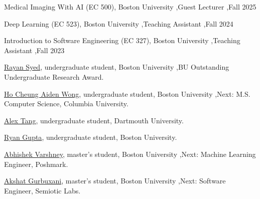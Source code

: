 \documentclass[10pt,letterpaper]{article}
\begin{document}
\begin{cvitems}
\end{cvitems}

\begin{cvitems}
\item Medical Imaging With AI (EC 500), Boston University \sep Guest Lecturer \sep Fall 2025
\item Deep Learning (EC 523), Boston University \sep Teaching Assistant \sep Fall 2024
\item Introduction to Software Engineering (EC 327), Boston University \sep Teaching Assistant \sep Fall 2023
\end{cvitems}

\begin{cvitems}
\item \href{https://www.linkedin.com/in/rayan-syed-507379296/}{Rayan Syed}, undergraduate student, Boston University \sep BU Outstanding Undergraduate Research Award.
\item \href{https://www.linkedin.com/in/aiden-wong-68962a22a/}{Ho Cheung Aiden Wong}, undergraduate student, Boston University \sep Next: M.S. Computer Science, Columbia University.
\item \href{https://www.linkedin.com/in/alexztang/}{Alex Tang}, undergraduate student, Dartmouth University.
\item \href{https://www.linkedin.com/in/ryan-gupta-a451b0262/}{Ryan Gupta}, undergraduate student, Boston University.
\item \href{https://www.linkedin.com/in/abhishek-varshney-a75748159/}{Abhishek Varshney}, master's student, Boston University \sep Next: Machine Learning Engineer, Poshmark.
\item \href{https://www.linkedin.com/in/akshatgurbuxani/}{Akshat Gurbuxani}, master's student, Boston University \sep Next: Software Engineer, Semiotic Labs.
\end{cvitems}
\end{document}
